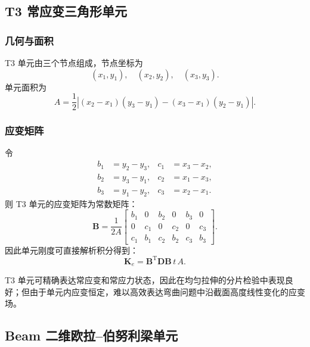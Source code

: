 \documentclass[UTF8,a4paper,zihao=-4]{ctexart}
\newcommand{\T}{\mathrm{T}}
\newcommand{\Dmat}{\bm{D}}
\newcommand{\Bmat}{\bm{B}}
\newcommand{\Kmat}{\bm{K}}
\begin{document}
\subsection{T3 常应变三角形单元}

\subsubsection{几何与面积}

T3 单元由三个节点组成，节点坐标为
\begin{equation}
    (x_1,y_1),\quad (x_2,y_2),\quad (x_3,y_3).
\end{equation}
单元面积为
\begin{equation}
    A
    =
    \frac{1}{2}
    \left|
    (x_2-x_1)(y_3-y_1)
    -
    (x_3-x_1)(y_2-y_1)
    \right|.
\end{equation}

\subsubsection{应变矩阵}

令
\begin{align}
    b_1 &= y_2-y_3, & c_1 &= x_3-x_2,\\
    b_2 &= y_3-y_1, & c_2 &= x_1-x_3,\\
    b_3 &= y_1-y_2, & c_3 &= x_2-x_1.
\end{align}
则 T3 单元的应变矩阵为常数矩阵：
\begin{equation}
    \Bmat
    =
    \frac{1}{2A}
    \begin{bmatrix}
        b_1 & 0 & b_2 & 0 & b_3 & 0\\
        0 & c_1 & 0 & c_2 & 0 & c_3\\
        c_1 & b_1 & c_2 & b_2 & c_3 & b_3
    \end{bmatrix}.
\end{equation}
因此单元刚度可直接解析积分得到：
\begin{equation}
    \Kmat_e
    =
    \Bmat^{\T}\Dmat\Bmat\,t\,A .
\end{equation}

T3 单元可精确表达常应变和常应力状态，因此在均匀拉伸的分片检验中表现良好；但由于单元内应变恒定，难以高效表达弯曲问题中沿截面高度线性变化的应变场。

\subsection{Beam 二维欧拉--伯努利梁单元}
\end{document}
